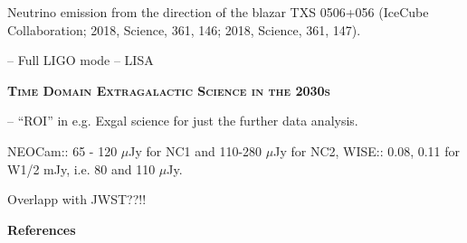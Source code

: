 \documentclass[12pt]{article}
\begin{document}
Neutrino emission from the direction of the blazar TXS 0506+056
(IceCube Collaboration; 
2018, Science, 361, 146; 
2018, Science, 361, 147).


\smallskip
\smallskip
\noindent
-- Full LIGO mode
-- LISA

\smallskip
\smallskip
\noindent
{\bfseries \textsc{\textcolor{Cerulean}{Time Domain Extragalactic Science in the 2030s}}}



\smallskip
\smallskip
\noindent
-- ``ROI'' in e.g. Exgal science for just the further data analysis. 

\smallskip
\smallskip
\noindent
NEOCam:: 65 -  120 $\mu$Jy for NC1 and 110-280 $\mu$Jy for NC2, 
WISE:: 0.08, 0.11 for W1/2 mJy, i.e. 80 and 110 $\mu$Jy.

\smallskip
\smallskip
\noindent
Overlapp with JWST??!!


\smallskip
\smallskip
\noindent
%


\pagebreak
\textbf{References}
\end{document}
